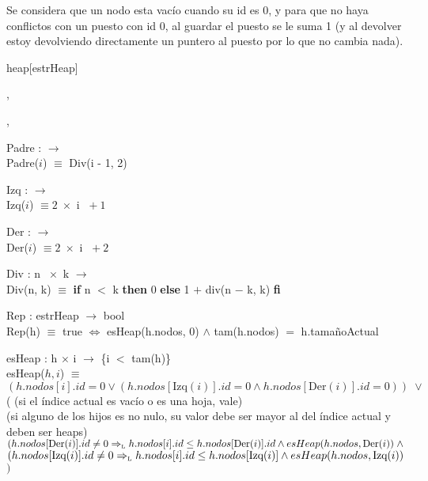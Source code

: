 \documentclass[../main.tex]{subfiles}
\begin{document}
\begin{representacion}
Se considera que un nodo esta vacío cuando su id es 0, y para que no haya conflictos con un puesto 
con id 0, al guardar el puesto se le suma 1 (y al devolver estoy devolviendo directamente un puntero
al puesto por lo que no cambia nada).

\begin{Estructura}{heap}[estrHeap]
    \begin{Tupla}[estrHeap]
        ,\\%
    \end{Tupla}

    \begin{Tupla}[tupPuesto]
        ,\\%
    \end{Tupla}
\end{Estructura}

Padre : \nat $\longrightarrow$ \nat\\
Padre($i$) $\equiv$ Div(i - 1, 2)

Izq : \nat $\longrightarrow$ \nat\\
Izq($i$) $\equiv 2\; \times $ i $\; + 1$

Der : \nat $\longrightarrow$ \nat\\
Der($i$) $\equiv 2\; \times $ i $\; + 2$

Div : \nat \;n $\; \times$ \nat \;k $\longrightarrow$ \nat\\
Div(n, k) $\equiv$ \textbf{if} n $<$ k \textbf{then} 0 \textbf{else} 1 $+$ div(n $-$ k, k) \textbf{fi}

Rep : estrHeap $\longrightarrow$ bool\\
Rep(h) $\equiv$ true $\iff$ esHeap(h.nodos, 0) $\land$ tam(h.nodos) $=$ h.tamañoActual

esHeap : \ad[\nat] h $\times$ \nat[] i $\longrightarrow$ \bool \hfill \{i $<$ tam(h)\} \\
esHeap($h, i$) $\equiv$\\
$(h.nodos[i].id = 0 \lor (h.nodos[\text{Izq}(i)].id = 0 \land h.nodos[\text{Der}(i)].id = 0)) \;\lor$ ( \vspace{2mm} \hfill (si el índice actual es vacío o es una hoja, vale)\\
(si alguno de los hijos es no nulo, su valor debe ser mayor al del índice actual y deben ser heaps)\\
 $(h.nodos[\text{Der}(i)].id \neq 0 \Rightarrow_{\mathrm{\scriptscriptstyle{L}}} h.nodos[i].id \leq h.nodos[\text{Der}(i)].id \land esHeap(h.nodos, \text{Der}(i)) \;\land$ \\
 $(h.nodos[\text{Izq}(i)].id \neq 0 \Rightarrow_{\mathrm{\scriptscriptstyle{L}}} h.nodos[i].id \leq h.nodos[\text{Izq}(i)] \land esHeap(h.nodos, \text{Izq}(i))$ $)$\\


\end{representacion}
\end{document}
